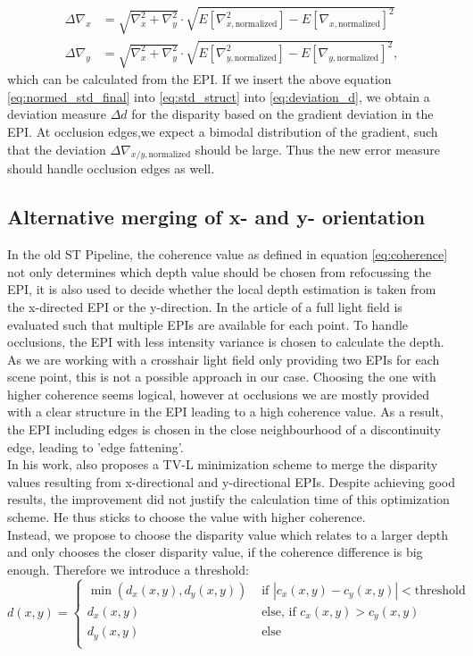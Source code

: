 \documentclass  [
  paper    = a4,
  BCOR     = 10mm,
  twoside,
  fontsize = 12pt,
  fleqn,
  toc      = bibnumbered,
  toc      = listofnumbered,
  numbers  = noendperiod,
  headings = normal,
  listof   = leveldown,
  version  = 3.03
]                                       {scrreprt}
\begin{document}
 \begin{align}\label{eq:normed_std_final}
 \Delta\nabla_{x} &=  \sqrt{\nabla_x^2 + \nabla_y^2} \cdot \sqrt{E[\nabla_{x, \text{normalized}}^2] - E[\nabla_{x, \text{normalized}}]^2}\\
 \Delta\nabla_{y} &= \sqrt{\nabla_x^2 + \nabla_y^2} \cdot \sqrt{E[\nabla_{y, \text{normalized}}^2] - E[\nabla_{y, \text{normalized}}]^2},
 \end{align}
 which can be calculated from the EPI.
 If we insert the above equation \ref{eq:normed_std_final} into \ref{eq:std_struct} into \ref{eq:deviation_d}, we obtain a deviation measure $\Delta d$ for the disparity based on the gradient deviation in the EPI. At occlusion edges,we expect a bimodal distribution of the gradient, such that the deviation $\Delta \nabla_{x/y, \text{normalized}}$ should be large. Thus the new error measure should handle occlusion edges as well.
 
 \subsection{Alternative merging of x- and y- orientation}
 In the old ST Pipeline, the coherence value as defined in equation \ref{eq:coherence} not only determines which depth value should be chosen from refocussing the EPI, it is also used to decide whether the local depth estimation is taken from the x-directed EPI or the y-direction. In the article of \cite{sheng2018occlusion} a full light field is evaluated such that multiple EPIs are available for each point. To handle occlusions, the EPI with less intensity variance is chosen to calculate the depth. As we are working with a crosshair light field only providing two EPIs for each scene point, this is not a possible approach in our case. Choosing the one with higher coherence seems logical, however at occlusions we are mostly provided with a clear structure in the EPI leading to a high coherence value. As a result, the EPI including edges is chosen in the close neighbourhood of a discontinuity edge, leading to 'edge fattening'.\\
 In his work, \cite{wanner2014orientation} also proposes a TV-L minimization scheme to merge the disparity values resulting from x-directional and y-directional EPIs. Despite achieving good results, the improvement did not justify the calculation time of this optimization scheme. He thus sticks to choose the value with higher coherence.\\
 Instead, we propose to choose the disparity value which relates to a larger depth and only chooses the closer disparity value, if the coherence difference is big enough. Therefore we introduce a threshold:
 \begin{equation}\label{eq:altmerging}
 d(x,y) = \begin{cases}
 \min(d_x(x,y),d_y(x,y))&\text{ if } |c_x(x,y)-c_y(x,y)|<\text{threshold} \\
  d_x(x,y)&\text{ else, if } c_x(x,y)> c_y(x,y)\\
  d_y(x,y)&\text{ else}\\
  \end{cases}
   \end{equation}
\end{document}
